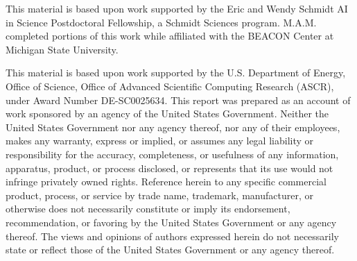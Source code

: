 This material is based upon work supported by the Eric and Wendy Schmidt AI in Science Postdoctoral Fellowship, a Schmidt Sciences program.
M.A.M. completed portions of this work while affiliated with the BEACON Center at Michigan State University.

This material is based upon work supported by the U.S. Department of Energy, Office of Science, Office of Advanced Scientific Computing Research (ASCR), under Award Number DE-SC0025634.
This report was prepared as an account of work sponsored by an agency of the United States Government.
Neither the United States Government nor any agency thereof, nor any of their employees, makes any warranty, express or implied, or assumes any legal liability or responsibility for the accuracy, completeness, or usefulness of any information, apparatus, product, or process disclosed, or represents that its use would not infringe privately owned rights.
Reference herein to any specific commercial product, process, or service by trade name, trademark, manufacturer, or otherwise does not necessarily constitute or imply its endorsement, recommendation, or favoring by the United States Government or any agency thereof.
The views and opinions of authors expressed herein do not necessarily state or reflect those of the United States Government or any agency thereof.
